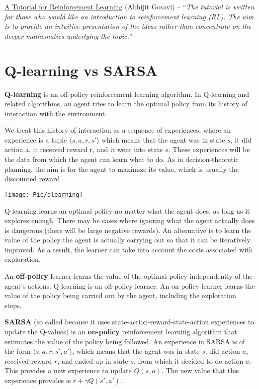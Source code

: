 \documentclass[a4paper, 11pt]{article}
\begin{document}
\href{https://web.mst.edu/~gosavia/tutorial.pdf}{A Tutorial for
Reinforcement Learning} (Abhijit Gosavi) -- ``\emph{The tutorial is
written for those who would like an introduction to reinforcement
learning (RL). The aim is to provide an intuitive presentation of the
ideas rather than concentrate on the deeper mathematics underlying the
topic.}''
\section{Q-learning vs SARSA}
\textbf{Q-learning} is an off-policy reinforcement learning algorithm. In Q-learning and related algorithms, an agent tries to learn the optimal policy from its history of interaction with the environment. 

We treat this history of interaction as a sequence of experiences, where an experience is a tuple $\langle s,a,r,s'\rangle$ which means that the agent was in state $s$, it did action a, it received reward r, and it went into state $s$. These experiences will be the data from which the
agent can learn what to do. As in decision-theoretic planning, the aim is for the agent to maximize its value, which is usually the discounted reward.

\texttt{[image: Pic/qlearning]}

Q-learning learns an optimal policy no matter what the agent does, as long as it explores enough. There may be cases where ignoring what the agent actually does is dangerous (there will be large negative rewards). An alternative is to learn the value of the policy the agent is actually carrying out so that it can be iteratively improved. As a result, the learner can take into account the costs associated with exploration.

An \textbf{off-policy} learner learns the value of the optimal policy independently of the agent’s actions. Q-learning is an off-policy learner. An on-policy learner
learns the value of the policy being carried out by the agent, including the exploration steps.

\textbf{SARSA} (so called because it uses state-action-reward-state-action experiences to update the Q-values) is an \textbf{on-policy} reinforcement learning algorithm that estimates the value of the policy being followed. An experience in SARSA is of the form $\langle s,a,r,s',a'\rangle$, which means that the agent was in state $s$, did action $a$, received reward $r$, and ended up in state $s$, from which it decided to do action $a$. This provides a new experience to update $Q(s, a)$. The new value that
this experience provides is $r+\gamma Q(s',a')$.
\end{document}
